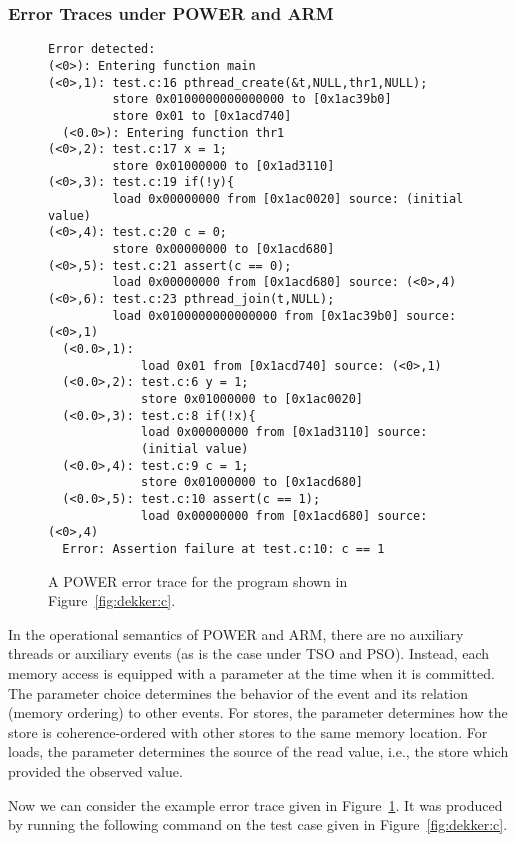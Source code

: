 \documentclass[a4paper]{article}
\begin{document}
\subsubsection{Error Traces under POWER and ARM}

\begin{figure}
\begin{verbatim}
Error detected:
(<0>): Entering function main
(<0>,1): test.c:16 pthread_create(&t,NULL,thr1,NULL);
         store 0x0100000000000000 to [0x1ac39b0]
         store 0x01 to [0x1acd740]
  (<0.0>): Entering function thr1
(<0>,2): test.c:17 x = 1;
         store 0x01000000 to [0x1ad3110]
(<0>,3): test.c:19 if(!y){
         load 0x00000000 from [0x1ac0020] source: (initial value)
(<0>,4): test.c:20 c = 0;
         store 0x00000000 to [0x1acd680]
(<0>,5): test.c:21 assert(c == 0);
         load 0x00000000 from [0x1acd680] source: (<0>,4)
(<0>,6): test.c:23 pthread_join(t,NULL);
         load 0x0100000000000000 from [0x1ac39b0] source: (<0>,1)
  (<0.0>,1):
             load 0x01 from [0x1acd740] source: (<0>,1)
  (<0.0>,2): test.c:6 y = 1;
             store 0x01000000 to [0x1ac0020]
  (<0.0>,3): test.c:8 if(!x){
             load 0x00000000 from [0x1ad3110] source:
             (initial value)
  (<0.0>,4): test.c:9 c = 1;
             store 0x01000000 to [0x1acd680]
  (<0.0>,5): test.c:10 assert(c == 1);
             load 0x00000000 from [0x1acd680] source: (<0>,4)
  Error: Assertion failure at test.c:10: c == 1
\end{verbatim}
\caption{A POWER error trace for the program shown in Figure~\ref{fig:dekker:c}.}\label{fig:ex:error:trace:dekker:power}
\end{figure}

In the operational semantics of POWER and ARM, there are no auxiliary
threads or auxiliary events (as is the case under TSO and
PSO). Instead, each memory access is equipped with a parameter at the
time when it is committed. The parameter choice determines the
behavior of the event and its relation (memory ordering) to other
events. For stores, the parameter determines how the store is
coherence-ordered with other stores to the same memory location. For
loads, the parameter determines the source of the read value, i.e.,
the store which provided the observed value.

Now we can consider the example error trace given in
Figure~\ref{fig:ex:error:trace:dekker:power}. It was produced by
running the following command on the test case given in
Figure~\ref{fig:dekker:c}.
\end{document}
